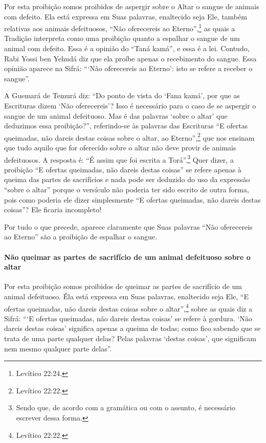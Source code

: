 Por esta proibição somos proibidos de aspergir sobre o Altar o sangue
de animais com defeito. Ela está expressa em Suas palavras, enaltecido
seja Ele, também relativas aos animais defeituosos, ``Não oferecereis ao
Eterno'',\footnote{Levítico 22:24.} as quais a Tradição interpreta como uma
proibição quanto a espalhar o sangue de um animal com defeito. Essa é a
opinião do ``Taná kamá'', e essa é a lei. Contudo, Rabi Yossi ben Yehudá
diz que ela proíbe apenas o recebimento do sangue. Essa opinião aparece
na Sifrá: ```Não oferecereis ao Eterno': isto se refere a receber o
sangue''.

A Guemará de Temurá diz: ``Do ponto de vista do `Fana
kamá', por que as Escrituras dizem `Não oferecereis'? Isso é necessário
para o caso de se aspergir o sangue de um animal defeituoso. Mas é das
palavras `sobre o altar' que deduzimos essa proibição?'', referindo-se
às palavras das Escrituras ``E ofertas queimadas, não dareis destas
coisas sobre o altar, ao Eterno'',\footnote{Levítico 22:22.} que nos ensinam que
tudo aquilo que for oferecido sobre o altar não deve provir de animais
defeituosos. A resposta é: ``É assim que foi escrita a
Torá''.\footnote{Sendo que, de acordo com a gramática ou com o assunto, é necessário
  escrever dessa forma.} Quer dizer, a proibição ``E ofertas
queimadas, não dareis destas coisas'' se refere apenas à queima das
partes de sacrifícios e nada pode ser deduzido do uso da expressão
``sobre o altar'' porque o versículo não poderia ter sido escrito de
outra forma, pois como poderia ele dizer simplesmente ``E ofertas
queimadas, não dareis destas coisas''? Ele ficaria incompleto!

Por tudo o que precede, aparece claramente que Suas palavras ``Não
oferecereis ao Eterno'' são a proibição de espalhar o sangue.

\paragraph{Não queimar as partes de sacrifício de um animal defeituoso sobre o altar}

Por esta proibição somos proibidos de queimar as partes de sacrifício
de um animal defeituoso. Éla está expressa em Suas palavras, enaltecido
seja Ele, ``E ofertas queimadas, não dareis destas coisas sobre o
altar'',\footnote{Levítico 22:22.} sobre as quais diz a Sifrá: ```E ofertas
queimadas, não dareis destas coisas' se refere à gordura. `Não dareis
destas coisas' significa apenas a queima de todas; como fico sabendo que
se trata de uma parte qualquer delas? Pelas palavras `destas coisas',
que significam nem mesmo qualquer parte delas''.

